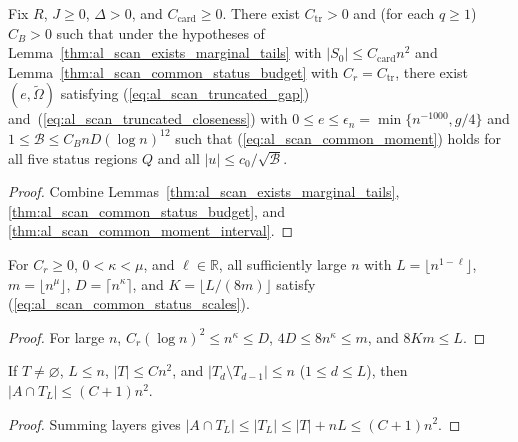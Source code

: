 \begin{lemma}
    \label{thm:al_scan_common_status_moments}
    Fix $R$, $J\ge0$, $\Delta>0$, and $C_{\mathrm{card}}\ge0$. There exist
    $C_{\mathrm{tr}}>0$ and (for each $q\ge1$) $C_B>0$ such that under the
    hypotheses of Lemma~\ref{thm:al_scan_exists_marginal_tails} with
    $|S_0|\le C_{\mathrm{card}}n^2$ and Lemma~\ref{thm:al_scan_common_status_budget}
    with $C_r=C_{\mathrm{tr}}$, there exist $(e,\widetilde\Omega)$ satisfying
    (\ref{eq:al_scan_truncated_gap}) and~(\ref{eq:al_scan_truncated_closeness})
    with $0\le e\le\epsilon_n=\min\{n^{-1000},g/4\}$ and
    $1\le\mathcal B\le C_BnD(\log n)^{12}$ such that
    (\ref{eq:al_scan_common_moment}) holds for all five status regions $Q$ and
    all $|u|\le c_0/\sqrt{\mathcal B}$.
\end{lemma}
\begin{proof}
    Combine Lemmas~\ref{thm:al_scan_exists_marginal_tails},
    \ref{thm:al_scan_common_status_budget}, and
    \ref{thm:al_scan_common_moment_interval}.
\end{proof}

\begin{lemma}
    \label{thm:al_scan_status_scale_separation}
    For $C_r\ge0$, $0<\kappa<\mu$, and $\ell\in\mathbb R$, all sufficiently
    large $n$ with $L=\lfloor n^{1-\ell}\rfloor$, $m=\lfloor n^\mu\rfloor$,
    $D=\lceil n^\kappa\rceil$, and $K=\lfloor L/(8m)\rfloor$ satisfy
    (\ref{eq:al_scan_common_status_scales}).
\end{lemma}
\begin{proof}
    For large $n$, $C_r(\log n)^2\le n^\kappa\le D$, $4D\le 8n^\kappa\le m$,
    and $8Km\le L$.
\end{proof}

\begin{lemma}
    \label{thm:al_scan_compact_quadratic_volume}
    If $T\ne\varnothing$, $L\le n$, $|T|\le Cn^2$, and
    $|T_d\setminus T_{d-1}|\le n$ ($1\le d\le L$), then
    $|A\cap T_L|\le(C+1)n^2$.
\end{lemma}
\begin{proof}
    Summing layers gives $|A\cap T_L|\le|T_L|\le|T|+nL\le(C+1)n^2$.
\end{proof}

